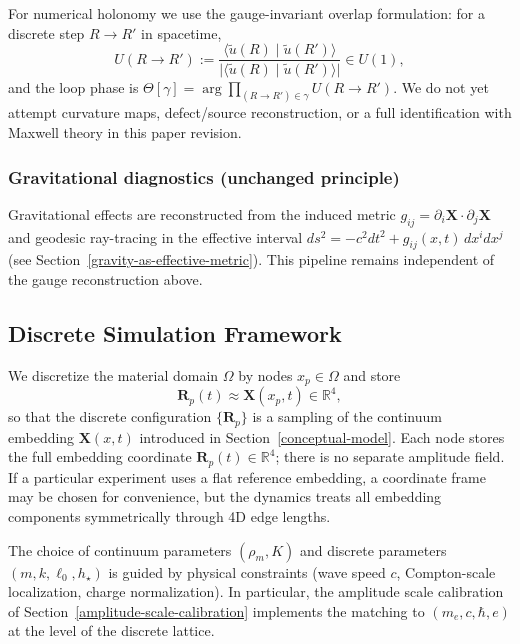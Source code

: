 For numerical holonomy we use the gauge-invariant overlap formulation: for a discrete step
$R\to R'$ in spacetime,
\begin{equation}
  U(R\to R') :=
  \frac{\langle \tilde u(R)\mid \tilde u(R')\rangle}
       {\big|\langle \tilde u(R)\mid \tilde u(R')\rangle\big|}\in U(1),
\end{equation}
and the loop phase is $\Theta[\gamma]=\arg\prod_{(R\to R')\in\gamma} U(R\to R')$.
We do not yet attempt curvature maps, defect/source reconstruction, or a full identification
with Maxwell theory in this paper revision.

\subsubsection{Gravitational diagnostics (unchanged principle)}

Gravitational effects are reconstructed from the induced metric
$g_{ij} = \partial_i \mathbf X \cdot \partial_j \mathbf X$ and geodesic
ray-tracing in the effective interval
$ds^2 = -c^2 dt^2 + g_{ij}(x,t) \, dx^i dx^j$
(see Section~\ref{gravity-as-effective-metric}). This pipeline remains
independent of the gauge reconstruction above.

\subsection{Discrete Simulation Framework}\label{discrete-simulation-framework}

We discretize the material domain $\Omega$ by nodes $x_p\in\Omega$ and store
\begin{equation}\label{eq:discrete-embedding}
  \mathbf R_p(t) \approx \mathbf X(x_p,t)\in\mathbb R^4,
\end{equation}
so that the discrete configuration $\{\mathbf R_p\}$ is a sampling of the continuum embedding
$\mathbf X(x,t)$ introduced in Section~\ref{conceptual-model}.
Each node stores the full embedding coordinate $\mathbf R_p(t)\in\mathbb R^4$; there is no separate amplitude field.
If a particular experiment uses a flat reference embedding, a coordinate frame may be chosen for convenience, but the
dynamics treats all embedding components symmetrically through 4D edge lengths.

The choice of continuum parameters $(\rho_m,K)$ and discrete parameters $(m,k,\ell_0,h_\star)$
is guided by physical constraints (wave speed $c$, Compton-scale localization,
charge normalization). In particular, the amplitude scale calibration
of Section~\ref{amplitude-scale-calibration} implements the matching to
$(m_e,c,\hbar,e)$ at the level of the discrete lattice.


